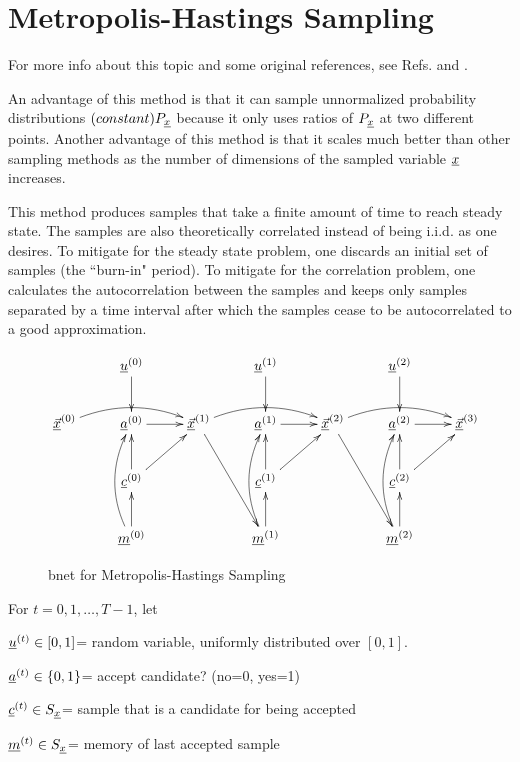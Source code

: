 \section*{Metropolis-Hastings Sampling}

For more info about this topic and 
some original references, 
see Refs.\cite{bendel-metro-hast}
and \cite{wiki-metro-hast}.

An advantage of this method is that it can sample
unnormalized probability distributions
$(constant)P_{\underline{x}}$ 
because it 
only uses ratios of
$P_{\underline{x}}$ at two different points.
Another advantage
of this method
is that it scales much 
better than other sampling
methods as the number
of dimensions of the
sampled variable ${\underline{x}}$
increases.

This method produces samples that 
take a finite amount of
time to reach steady state. The samples
are also
theoretically correlated instead
of being i.i.d. as one desires.
To mitigate for the steady state problem,
one discards an initial set
of samples (the ``burn-in" period).
To mitigate for the correlation problem,
one calculates the autocorrelation
between the samples
and keeps only samples separated
by a time interval 
after which the samples 
cease to be autocorrelated to
a good approximation.



\begin{figure}[h!]
$$\xymatrix{
&\rvu^{(0)}\ar[d]
&&\rvu^{(1)}\ar[d]
&&\rvu^{(2)}\ar[d]
\\
\ul{\vecx}^{(0)}\ar@/^1pc/[rr]
&\rva^{(0)}\ar[r]
&
\ul{\vecx}^{(1)}\ar@/^1pc/[rr]\ar[rdd]
&\rva^{(1)}\ar[r]
&
\ul{\vecx}^{(2)}\ar@/^1pc/[rr]\ar[rdd]
&\rva^{(2)}\ar[r]
&\ul{\vecx}^{(3)}
\\
&\rvc^{(0)}\ar[u]\ar[ru]
&&\rvc^{(1)}\ar[u]\ar[ru]
&&\rvc^{(2)}\ar[u]\ar[ru]
\\
&\rvm^{(0)}\ar[u]\ar@/^1pc/[uu]
&&\rvm^{(1)}\ar[u]\ar@/^1pc/[uu]
&&\rvm^{(2)}\ar[u]\ar@/^1pc/[uu]
}$$
\caption{bnet for Metropolis-Hastings Sampling}
\label{fig-mcmc-metro-bnet}
\end{figure}

For $t=0, 1, \dots, T-1$, let

${\underline{u}}^{(t)}\in [0,1]$= random variable,
uniformly
distributed over $[0,1]$.

${\underline{a}}^{(t)}\in \{0,1\}$= accept candidate? (no=0, yes=1)

${\underline{c}}^{(t)}\in S_{\underline{x}}$= sample that is a 
candidate for being accepted

${\underline{m}}^{(t)}\in S_{\underline{x}}$= memory
of last accepted sample

